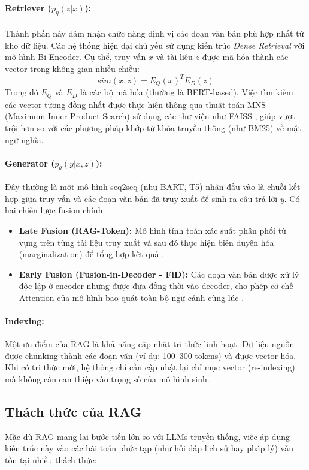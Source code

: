 \paragraph{Retriever ($p_\eta(z|x)$):} 
Thành phần này đảm nhận chức năng định vị các đoạn văn bản phù hợp nhất từ kho dữ liệu. Các hệ thống hiện đại chủ yếu sử dụng kiến trúc \textit{Dense Retrieval} với mô hình Bi-Encoder. Cụ thể, truy vấn $x$ và tài liệu $z$ được mã hóa thành các vector trong không gian nhiều chiều:
\begin{equation}
    sim(x, z) = E_Q(x)^T E_D(z)
\end{equation}
Trong đó $E_Q$ và $E_D$ là các bộ mã hóa (thường là BERT-based). Việc tìm kiếm các vector tương đồng nhất được thực hiện thông qua thuật toán MNS (Maximum Inner Product Search) sử dụng các thư viện như FAISS \cite{karpukhin2020dpr}, giúp vượt trội hơn so với các phương pháp khớp từ khóa truyền thống (như BM25) về mặt ngữ nghĩa.

\paragraph{Generator ($p_\theta(y|x, z)$):} 
Đây thường là một mô hình seq2seq (như BART, T5) nhận đầu vào là chuỗi kết hợp giữa truy vấn và các đoạn văn bản đã truy xuất để sinh ra câu trả lời $y$. Có hai chiến lược fusion chính:
\begin{itemize}
    \item \textbf{Late Fusion (RAG-Token):} Mô hình tính toán xác suất phân phối từ vựng trên từng tài liệu truy xuất và sau đó thực hiện biên duyên hóa (marginalization) để tổng hợp kết quả \cite{lewis2020rag}.
    \item \textbf{Early Fusion (Fusion-in-Decoder - FiD):} Các đoạn văn bản được xử lý độc lập ở encoder nhưng được đưa đồng thời vào decoder, cho phép cơ chế Attention của mô hình bao quát toàn bộ ngữ cảnh cùng lúc \cite{izacard2021fid}.
\end{itemize}

\paragraph{Indexing:} 
Một ưu điểm của RAG là khả năng cập nhật tri thức linh hoạt. Dữ liệu nguồn được chunking thành các đoạn văn (ví dụ: 100--300 tokens) và được vector hóa. Khi có tri thức mới, hệ thống chỉ cần cập nhật lại chỉ mục vector (re-indexing) mà không cần can thiệp vào trọng số của mô hình sinh.

\subsection{Thách thức của RAG}
Mặc dù RAG mang lại bước tiến lớn so với LLMs truyền thống, việc áp dụng kiến trúc này vào các bài toán phức tạp (như hỏi đáp lịch sử hay pháp lý) vẫn tồn tại nhiều thách thức:

